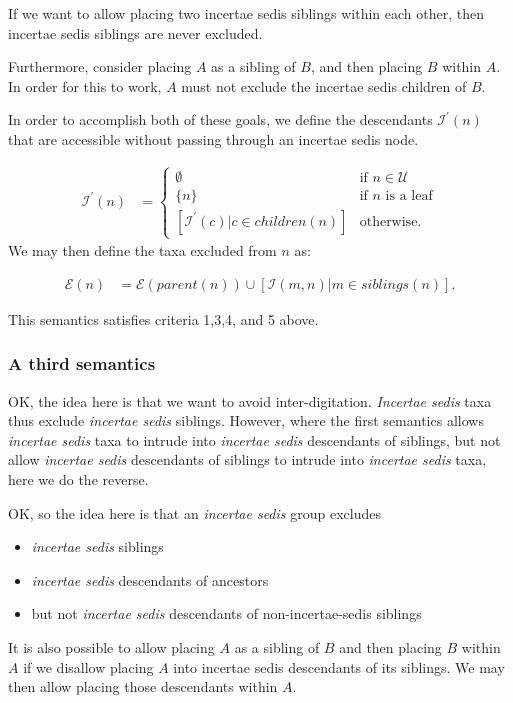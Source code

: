 \documentclass[english]{article}
\begin{document}
If we want to allow placing two incertae sedis siblings within each
other, then incertae sedis siblings are never excluded.

Furthermore, consider placing $A$ as a sibling of $B$, and then
placing $B$ within $A$.
In order for this to work, $A$ must not
exclude the incertae sedis children of $B$.

In order to accomplish both of these goals, we define the descendants
$\mathcal{I}^{\prime}(n)$ that are accessible without passing through
an incertae sedis node.

\begin{align*}
    \mathcal{I^{\prime}}(n) & =
    \begin{cases}
        \emptyset & \text{if }n\in\mathcal{U}\\
        \{n\} & \text{if }n\text{ is a leaf}\\
        [\mathcal{I}^{\prime}(c)|c\in children(n)] & \text{otherwise.}
\end{cases}
\end{align*} We may then define the taxa excluded from $n$
as:

\begin{align*} 
\mathcal{E}(n) & =\mathcal{E}(parent(n))\cup\left[\mathcal{I}(m,n)\big|m\in siblings(n)\right].\label{eq:exclude-set-formula-1}
\end{align*}

This semantics satisfies criteria 1,3,4, and 5 above.

\subsubsection{A third semantics}

OK, the idea here is that we want to avoid inter-digitation.
\emph{Incertae sedis} taxa thus exclude\emph{ incertae sedis}
siblings.
However, where the first semantics allows \emph{incertae
sedis }taxa to intrude into \emph{incertae sedis} descendants of
siblings, but not allow\emph{ incertae sedis} descendants of siblings
to intrude into \emph{incertae sedis} taxa, here we do the reverse.

OK, so the idea here is that an\emph{ incertae sedis} group excludes
\begin{itemize} \item \emph{incertae sedis} siblings \item
\emph{incertae sedis }descendants of ancestors \item but not\emph{
incertae sedis} descendants of non-incertae-sedis siblings
\end{itemize} It is also possible to allow placing $A$ as a sibling of
$B$ and then placing $B$ within $A$ if we disallow placing $A$ into
incertae sedis descendants of its siblings.
We may then allow placing
those descendants within $A$.
\end{document}
